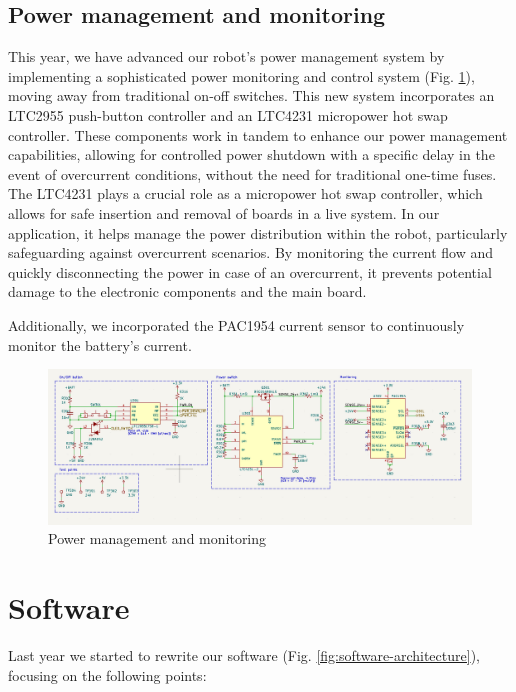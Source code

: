 \documentclass[runningheads]{llncs}
\begin{document}
\subsection{Power management and monitoring}

This year, we have advanced our robot's power management system by implementing a sophisticated power monitoring and control system (Fig. \ref{fig:PMU}), moving away from traditional on-off switches. This new system incorporates an LTC2955 push-button controller and an LTC4231 micropower hot swap controller. These components work in tandem to enhance our power management capabilities, allowing for controlled power shutdown with a specific delay in the event of overcurrent conditions, without the need for traditional one-time fuses.
The LTC4231 plays a crucial role as a micropower hot swap controller, which allows for safe insertion and removal of boards in a live system. In our application, it helps manage the power distribution within the robot, particularly safeguarding against overcurrent scenarios. By monitoring the current flow and quickly disconnecting the power in case of an overcurrent, it prevents potential damage to the electronic components and the main board.

Additionally, we incorporated the PAC1954 current sensor to continuously monitor the battery's current.

\begin{figure}
    \centering
    \includegraphics[width=1\textwidth]{images/PMU.png}
    \caption{Power management and monitoring}
    \label{fig:PMU}
\end{figure}


\section{Software}
Last year we started to rewrite our software (Fig. \ref{fig:software-architecture}), focusing on the following points:
\end{document}
